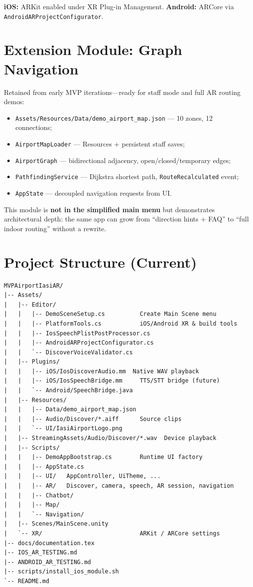 \documentclass[11pt,a4paper]{article}
\begin{document}
\textbf{iOS:} ARKit enabled under XR Plug-in Management. \textbf{Android:} ARCore via \texttt{AndroidARProjectConfigurator}.

\section{Extension Module: Graph Navigation}

Retained from early MVP iterations---ready for staff mode and full AR routing demos:

\begin{itemize}
    \item \texttt{Assets/Resources/Data/demo\_airport\_map.json} --- 10 zones, 12 connections;
    \item \texttt{AirportMapLoader} --- Resources + persistent staff saves;
    \item \texttt{AirportGraph} --- bidirectional adjacency, open/closed/temporary edges;
    \item \texttt{PathfindingService} --- Dijkstra shortest path, \texttt{RouteRecalculated} event;
    \item \texttt{AppState} --- decoupled navigation requests from UI.
\end{itemize}

This module is \textbf{not in the simplified main menu} but demonstrates architectural depth: the same app can grow from ``direction hints + FAQ'' to ``full indoor routing'' without a rewrite.

\section{Project Structure (Current)}

\begin{verbatim}
MVPAirportIasiAR/
|-- Assets/
|   |-- Editor/
|   |   |-- DemoSceneSetup.cs          Create Main Scene menu
|   |   |-- PlatformTools.cs           iOS/Android XR & build tools
|   |   |-- IosSpeechPlistPostProcessor.cs
|   |   |-- AndroidARProjectConfigurator.cs
|   |   `-- DiscoverVoiceValidator.cs
|   |-- Plugins/
|   |   |-- iOS/IosDiscoverAudio.mm  Native WAV playback
|   |   |-- iOS/IosSpeechBridge.mm     TTS/STT bridge (future)
|   |   `-- Android/SpeechBridge.java
|   |-- Resources/
|   |   |-- Data/demo_airport_map.json
|   |   |-- Audio/Discover/*.aiff      Source clips
|   |   `-- UI/IasiAirportLogo.png
|   |-- StreamingAssets/Audio/Discover/*.wav  Device playback
|   |-- Scripts/
|   |   |-- DemoAppBootstrap.cs        Runtime UI factory
|   |   |-- AppState.cs
|   |   |-- UI/   AppController, UiTheme, ...
|   |   |-- AR/   Discover, camera, speech, AR session, navigation
|   |   |-- Chatbot/
|   |   |-- Map/
|   |   `-- Navigation/
|   |-- Scenes/MainScene.unity
|   `-- XR/                            ARKit / ARCore settings
|-- docs/documentation.tex
|-- IOS_AR_TESTING.md
|-- ANDROID_AR_TESTING.md
|-- scripts/install_ios_module.sh
`-- README.md
\end{verbatim}
\end{document}
